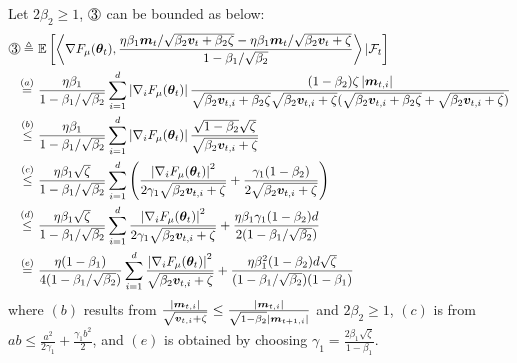 \begin{appendices}
Let $2\beta_2 \geq 1$, $\circled{3}$ can be bounded as below:
\begin{equation}
\begin{aligned}
\circled{3}\triangleq\,\,&\E\left[\left\langle \nabla F_{\mu}(\vtheta_t), \frac{\eta\beta_1\vm_{t}/\sqrt{\beta_2\vv_{t} + \beta_2\zeta} - \eta\beta_1\vm_t / \sqrt{\beta_2\vv_{t} + \zeta}}{1-\beta_1/\sqrt{\beta_2}}\right\rangle | \gF_t \right] \\
\stackrel{(a)}{=}\,\,&\frac{\eta\beta_1}{1-\beta_1/\sqrt{\beta_2}}\sum_{i=1}^d\left|\nabla_i F_{\mu}(\vtheta_t)\right|\frac{(1-\beta_2)\zeta\left|\vm_{t,i}\right|}{\sqrt{\beta_2\vv_{t,i} + \beta_2\zeta}\sqrt{\beta_2\vv_{t,i} + \zeta}(\sqrt{\beta_2\vv_{t,i} + \beta_2\zeta} + \sqrt{\beta_2\vv_{t,i} + \zeta})} \\
\stackrel{(b)}{\leq}\,\,&\frac{\eta\beta_1}{1-\beta_1/\sqrt{\beta_2}}\sum_{i=1}^d\left|\nabla_i F_{\mu}(\vtheta_t)\right|\frac{\sqrt{1-\beta_2}\sqrt{\zeta}}{\sqrt{\beta_2\vv_{t,i} + \zeta}} \\
\stackrel{(c)}{\leq}\,\,&\frac{\eta\beta_1\sqrt{\zeta}}{1-\beta_1/\sqrt{\beta_2}}\sum_{i=1}^d\left(\frac{\left|\nabla_i F_{\mu}(\vtheta_t)\right|^2}{2\gamma_1\sqrt{\beta_2\vv_{t,i} + \zeta}} + \frac{\gamma_1(1-\beta_2)}{2\sqrt{\beta_2\vv_{t,i} + \zeta}}\right) \\
\stackrel{(d)}{\leq}\,\,&\frac{\eta\beta_1\sqrt{\zeta}}{1-\beta_1/\sqrt{\beta_2}}\sum_{i=1}^d\frac{\left|\nabla_i F_{\mu}(\vtheta_t)\right|^2}{2\gamma_1\sqrt{\beta_2\vv_{t,i} + \zeta}} + \frac{\eta\beta_1\gamma_1(1-\beta_2)d}{2(1-\beta_1/\sqrt{\beta_2})} \\
\stackrel{(e)}{=}\,\,&\frac{\eta(1-\beta_1)}{4(1-\beta_1/\sqrt{\beta_2})}\sum_{i=1}^d\frac{\left|\nabla_i F_{\mu}(\vtheta_t)\right|^2}{\sqrt{\beta_2\vv_{t,i} + \zeta}} + \frac{\eta\beta_1^2(1-\beta_2)d\sqrt{\zeta}}{(1-\beta_1/\sqrt{\beta_2})(1-\beta_1)} \label{eq:cir-3}
\end{aligned}
\end{equation}
where $(b)$ results from $\frac{\left|{\bm{m}}_{t,i}\right|}{\sqrt{{\bm{v}}_{t,i} + \zeta}} \leq \frac{\left|{\bm{m}}_{t,i}\right|}{\sqrt{1 - \beta_2}\left|{\bm{m}}_{t+1,i}\right|}$ and $2\beta_2 \geq 1$, $(c)$ is from $ab \leq \frac{a^2}{2\gamma_1} + \frac{\gamma_1 b^2}{2}$, and $(e)$ is obtained by choosing $\gamma_1 = \frac{2\beta_1\sqrt{\zeta}}{1-\beta_1}$.


\end{appendices}
